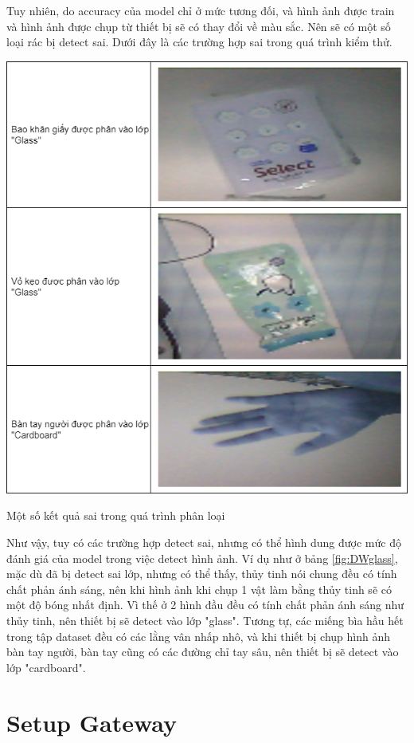 Tuy nhiên, do accuracy của model chỉ ở mức tương đối, và hình ảnh được train và hình ảnh được chụp từ thiết bị sẽ có thay đổi về màu sắc. Nên sẽ có một số loại rác bị detect sai. Dưới đây là các trường hợp sai trong quá trình kiểm thử.
\begin{table}[H]
    \centering
    \includegraphics[width=\linewidth]{images/Quanh/Trash Failed.png}
    \caption{Một số kết quả sai trong quá trình phân loại}
    \label{fig:DWglass}
\end{table}

Như vậy, tuy có các trường hợp detect sai, nhưng có thể hình dung được mức độ đánh giá của model trong việc detect hình ảnh. Ví dụ như ở bảng \ref{fig:DWglass}, mặc dù đã bị detect sai lớp, nhưng có thể thấy, thủy tinh nói chung đều có tính chất phản ánh sáng, nên khi hình ảnh khi chụp 1 vật làm bằng thủy tinh sẽ có một độ bóng nhất định. Vì thế ở 2 hình đầu  đều có tính chất phản ánh sáng như thủy tinh, nên thiết bị sẽ detect vào lớp "glass". Tương tự, các miếng bìa hầu hết trong tập dataset đều có các lằng vân nhấp nhô, và khi thiết bị chụp hình ảnh bàn tay người, bàn tay cũng có các đường chỉ tay sâu, nên thiết bị sẽ detect vào lớp "cardboard".

\section{Setup Gateway}
